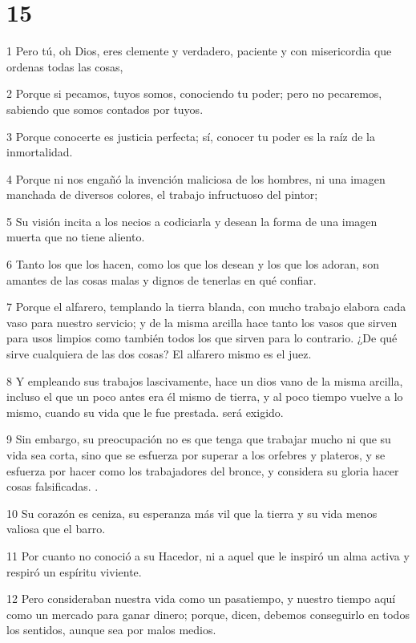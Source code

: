 \chapter{15}

\par 1 Pero tú, oh Dios, eres clemente y verdadero, paciente y con misericordia que ordenas todas las cosas,
\par 2 Porque si pecamos, tuyos somos, conociendo tu poder; pero no pecaremos, sabiendo que somos contados por tuyos.
\par 3 Porque conocerte es justicia perfecta; sí, conocer tu poder es la raíz de la inmortalidad.
\par 4 Porque ni nos engañó la invención maliciosa de los hombres, ni una imagen manchada de diversos colores, el trabajo infructuoso del pintor;
\par 5 Su visión incita a los necios a codiciarla y desean la forma de una imagen muerta que no tiene aliento.
\par 6 Tanto los que los hacen, como los que los desean y los que los adoran, son amantes de las cosas malas y dignos de tenerlas en qué confiar.
\par 7 Porque el alfarero, templando la tierra blanda, con mucho trabajo elabora cada vaso para nuestro servicio; y de la misma arcilla hace tanto los vasos que sirven para usos limpios como también todos los que sirven para lo contrario. ¿De qué sirve cualquiera de las dos cosas? El alfarero mismo es el juez.
\par 8 Y empleando sus trabajos lascivamente, hace un dios vano de la misma arcilla, incluso el que un poco antes era él mismo de tierra, y al poco tiempo vuelve a lo mismo, cuando su vida que le fue prestada. será exigido.
\par 9 Sin embargo, su preocupación no es que tenga que trabajar mucho ni que su vida sea corta, sino que se esfuerza por superar a los orfebres y plateros, y se esfuerza por hacer como los trabajadores del bronce, y considera su gloria hacer cosas falsificadas. .
\par 10 Su corazón es ceniza, su esperanza más vil que la tierra y su vida menos valiosa que el barro.
\par 11 Por cuanto no conoció a su Hacedor, ni a aquel que le inspiró un alma activa y respiró un espíritu viviente.
\par 12 Pero consideraban nuestra vida como un pasatiempo, y nuestro tiempo aquí como un mercado para ganar dinero; porque, dicen, debemos conseguirlo en todos los sentidos, aunque sea por malos medios.
